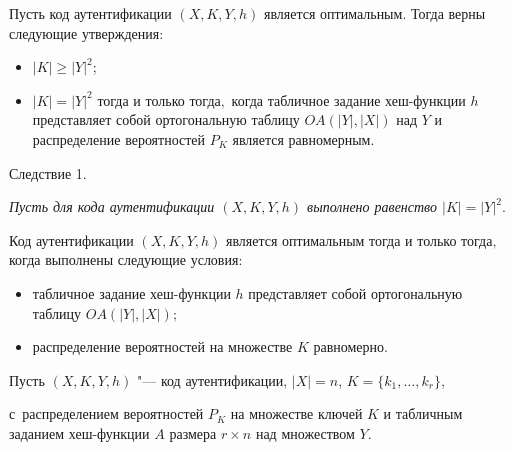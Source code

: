 {\it

Пусть код аутентификации $(X, K, Y, h)$ является оп\-ти\-маль\-ным$.$ Тогда верны следующие утверждения{\/\rm:}



\begin{itemize}

\item[$(i)$] $|K| \geq |Y|^2$;



\item[$(ii)$] $|K|=|Y|^2$ тогда и только тогда$,$ когда табличное задание хеш-функции $h$ представляет собой ортогональную таблицу $OA(|Y|, |X|)$ над $Y$ и распределение вероятностей $P_{K}$ является равномерным$.$



\end{itemize}

}



\vskip 0.1in

\hypertarget{rats:sl:1}{}

{\small \sc Следствие 1.}

{\it Пусть для кода аутентификации $(X,K,Y,h)$ выполнено равенство $|K|=|Y|^2.$ 

Код аутентификации $(X,K,Y,h)$ является оптимальным тогда и только тогда$,$ когда выполнены следующие условия{\/\rm:}



\begin{itemize}

\item[$(i)$] табличное задание хеш-функции $h$ представляет собой ортогональную таблицу $OA(|Y|, |X|);$



\item[$(ii)$] распределение вероятностей на множестве $K$ равномерно$.$



\end{itemize}

}



\vskip 0.1in



Пусть $(X,K,Y,h)$ "--- код аутентификации, $|X|=n$, $K=\{k_1,\dots, k_r\}$, 

с~распределением вероятностей $P_{K}$ на множестве ключей $K$ и табличным заданием хеш-функции $A$ размера $r\times n$ над множеством $Y$. 

